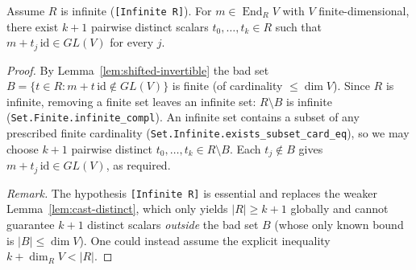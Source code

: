 \begin{lemma}
    \label{lem:exists-distinct-invertible-shifts}
    Assume $R$ is infinite (\texttt{[Infinite R]}). For $m \in \operatorname{End}_R V$ with $V$
    finite-dimensional, there exist $k+1$ pairwise distinct scalars $t_0, \ldots, t_k \in R$ such that
    $m + t_j\,\mathrm{id} \in GL(V)$ for every $j$.
\end{lemma}
\begin{proof}
    By Lemma~\ref{lem:shifted-invertible} the bad set $B = \{ t \in R : m + t\,\mathrm{id} \notin GL(V)\}$
    is finite (of cardinality $\le \dim V$). Since $R$ is infinite, removing a finite set leaves an
    infinite set: $R \setminus B$ is infinite (\texttt{Set.Finite.infinite\_compl}). An infinite set
    contains a subset of any prescribed finite cardinality (\texttt{Set.Infinite.exists\_subset\_card\_eq}),
    so we may choose $k+1$ pairwise distinct $t_0, \ldots, t_k \in R \setminus B$. Each $t_j \notin B$ gives
    $m + t_j\,\mathrm{id} \in GL(V)$, as required.

    \emph{Remark.} The hypothesis \texttt{[Infinite R]} is essential and replaces the weaker
    Lemma~\ref{lem:cast-distinct}, which only yields $|R| \ge k+1$ globally and cannot guarantee $k+1$
    distinct scalars \emph{outside} the bad set $B$ (whose only known bound is $|B| \le \dim V$). One could
    instead assume the explicit inequality $k + \dim_R V < |R|$.
\end{proof}

